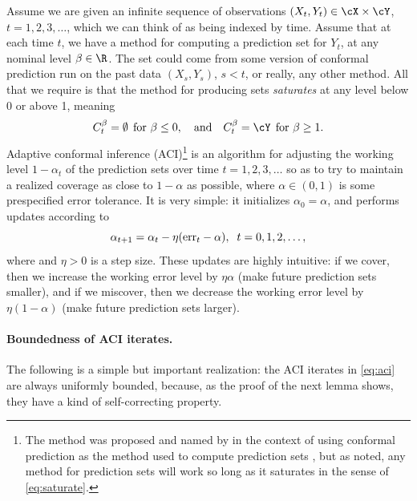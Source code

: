 \documentclass{article}
\begin{document}
Assume we are given an infinite sequence of observations $(X_t,Y_t) \in \cX
\times \cY$, $t=1,2,3,\ldots$, which we can think of as being indexed by
time. Assume that at each time $t$, we have a method for computing a prediction
set  for $Y_t$, at any nominal level $\beta \in 
\R$. The set  could come from some version of conformal
prediction run on the past data $(X_s,Y_s)$, $s<t$, or really, any other
method. All that we require is that the method for producing sets
\emph{saturates} at any level below 0 or above 1, meaning  
\begin{equation}
\label{eq:saturate}
C_t^\beta = \emptyset \;\, \text{for $\beta \leq 0$}, \quad \text{and} \quad 
C_t^\beta = \cY \;\, \text{for $\beta \geq 1$}.
\end{equation}
Adaptive conformal inference (ACI)\footnote{The method was proposed and named by
  \citet{gibbs2021adaptive} in the context of using conformal prediction as the
  method used to compute prediction sets , but as noted, any
  method for prediction sets will work so long as it saturates in the sense of
  \eqref{eq:saturate}.}  
is an algorithm for adjusting the working level $1-\alpha_t$ of the prediction 
sets over time $t=1,2,3,\ldots$ so as to try to maintain a realized coverage as
close to $1-\alpha$ as possible, where $\alpha \in (0,1)$ is some prespecified
error tolerance. It is very simple: it initializes $\alpha_0 = \alpha$, and
performs updates according to    
\begin{equation}
\label{eq:aci}
\alpha_{t+1} = \alpha_t - \eta (\text{err}_t - \alpha), \;\; t=0,1,2,\ldots,
\end{equation}
where  and $\eta>0$ is a
step size. These updates are highly intuitive: if we cover, then we increase the
working error level by $\eta \alpha$ (make future prediction sets smaller), and
if we miscover, then we decrease the working error level by $\eta (1-\alpha)$
(make future prediction sets larger).

\paragraph{Boundedness of ACI iterates.}

The following is a simple but important realization: the ACI iterates in
\eqref{eq:aci} are always uniformly bounded, because, as the proof of the next
lemma shows, they have a kind of self-correcting property.  
\end{document}
